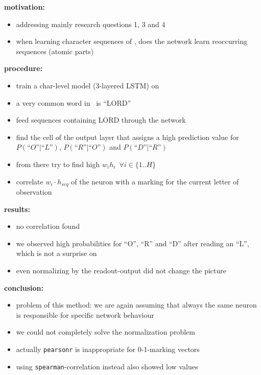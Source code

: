 \begin{frame}{\expiii}
	\textbf{motivation:}
	\begin{itemize} %
		\item addressing mainly research questions 1, 3 and 4
		\item when learning character sequences of \kj, does the network learn reoccurring sequences (atomic parts)
	\end{itemize}
	\textbf{procedure:}
	\begin{itemize}
		\item train a char-level model (3-layered LSTM) on \kj
		\item a very common word in \kj~is “LORD”
		\item feed sequences containing LORD through the network
		\item find the cell of the output layer that assigns a high prediction value for $P(“O” \mid “L”)$, $P(“R” \mid “O”)$ and $P(“D” \mid “R”)$
		\item from there try to find high $w_ih_i$~$\forall i \in \{1..H\}$
		\item correlate $w_i\cdot h_{seq}$ of the neuron with a marking for the current letter of observation %
	\end{itemize}
\end{frame}
\begin{frame}{\expiii}
	\textbf{results:}
	\begin{itemize}
		\item no correlation found
		\item we observed high probabilities for “O”, “R” and “D” after reading an “L”, which is not a surprise on \kj
		\item even normalizing by the readout-output did not change the picture 
	\end{itemize}
	\textbf{conclusion:}
	\begin{itemize}
		\item problem of this method: we are again assuming that always the same neuron is responsible for specific network behaviour	
		\item we could not completely solve the normalization problem	
		\item actually \texttt{pearsonr} is inappropriate for 0-1-marking vectors
		\item using \texttt{spearman}-correlation instead also showed low values
	\end{itemize}
\end{frame}